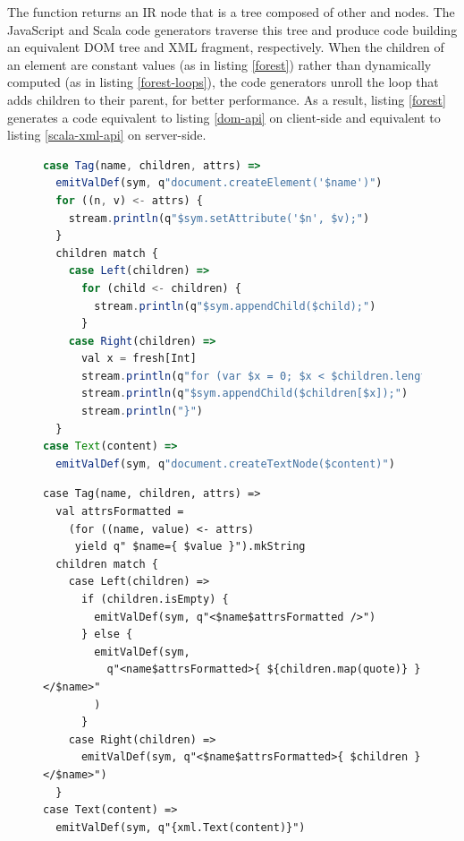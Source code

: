 \documentclass[preprint]{sigplanconf}
\begin{document}
The  function returns an  IR node that is a tree composed of other
 and  nodes. The JavaScript and Scala code generators traverse this tree
and produce code building an equivalent DOM tree and XML fragment, respectively. When the children
of an element are constant values (as in listing \ref{forest}) rather than dynamically computed (as
in listing \ref{forest-loops}), the code generators unroll the loop that adds children to their
parent, for better performance. As a result, listing \ref{forest} generates a code equivalent to
listing \ref{dom-api} on client-side and equivalent to listing \ref{scala-xml-api} on server-side.

\begin{figure}
\begin{lstlisting}[language=JavaScript,label=js-gen-forest,caption=JavaScript code generator for the
DOM fragment definition DSL]
case Tag(name, children, attrs) =>
  emitValDef(sym, q"document.createElement('$name')")
  for ((n, v) <- attrs) {
    stream.println(q"$sym.setAttribute('$n', $v);")
  }
  children match {
    case Left(children) =>
      for (child <- children) {
        stream.println(q"$sym.appendChild($child);")
      }
    case Right(children) =>
      val x = fresh[Int]
      stream.println(q"for (var $x = 0; $x < $children.length; $x++) {")
      stream.println(q"$sym.appendChild($children[$x]);")
      stream.println("}")
  }
case Text(content) =>
  emitValDef(sym, q"document.createTextNode($content)")
\end{lstlisting}
\end{figure}

\begin{figure}
\begin{lstlisting}[label=scala-gen-forest,caption=Scala code generator for the DOM fragment
definition DSL]
case Tag(name, children, attrs) =>
  val attrsFormatted =
    (for ((name, value) <- attrs)
     yield q" $name={ $value }").mkString
  children match {
    case Left(children) =>
      if (children.isEmpty) {
        emitValDef(sym, q"<$name$attrsFormatted />")
      } else {
        emitValDef(sym,
          q"<name$attrsFormatted>{ ${children.map(quote)} }</$name>"
        )
      }
    case Right(children) =>
      emitValDef(sym, q"<$name$attrsFormatted>{ $children }</$name>")
  }
case Text(content) =>
  emitValDef(sym, q"{xml.Text(content)}")
\end{lstlisting}
\end{figure}
\end{document}
